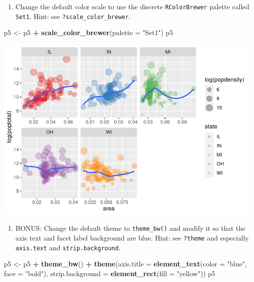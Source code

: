 \documentclass[
]{book}
\newenvironment{Shaded}{\begin{snugshade}}{\end{snugshade}}
\newcommand{\DataTypeTok}[1]{\textcolor[rgb]{0.13,0.29,0.53}{#1}}
\newcommand{\KeywordTok}[1]{\textcolor[rgb]{0.13,0.29,0.53}{\textbf{#1}}}
\newcommand{\NormalTok}[1]{#1}
\newcommand{\OperatorTok}[1]{\textcolor[rgb]{0.81,0.36,0.00}{\textbf{#1}}}
\newcommand{\StringTok}[1]{\textcolor[rgb]{0.31,0.60,0.02}{#1}}
\providecommand{\tightlist}{%
  \setlength{\itemsep}{0pt}\setlength{\parskip}{0pt}}
\begin{document}
\begin{alert}
\begin{enumerate}
\def\labelenumi{\arabic{enumi}.}
\setcounter{enumi}{4}
\tightlist
\item
  Change the default color scale to use the discrete \texttt{RColorBrewer} palette called \texttt{Set1}. Hint: see \texttt{?scale\_color\_brewer}.
\end{enumerate}

\begin{Shaded}
\begin{Highlighting}[]
\NormalTok{p5 \textless{}{-}}\StringTok{ }\NormalTok{p5 }\OperatorTok{+}\StringTok{ }\KeywordTok{scale\_color\_brewer}\NormalTok{(}\DataTypeTok{palette =} \StringTok{"Set1"}\NormalTok{)}
\NormalTok{p5}
\end{Highlighting}
\end{Shaded}

\includegraphics{R/Rgraphics/figures/unnamed-chunk-214-1.pdf}

\begin{enumerate}
\def\labelenumi{\arabic{enumi}.}
\setcounter{enumi}{5}
\tightlist
\item
  BONUS: Change the default theme to \texttt{theme\_bw()} and modify it so that the axis text and facet label background are blue. Hint: see \texttt{?theme} and especially \texttt{axis.text} and \texttt{strip.background}.
\end{enumerate}

\begin{Shaded}
\begin{Highlighting}[]
\NormalTok{p5 \textless{}{-}}\StringTok{ }\NormalTok{p5 }\OperatorTok{+}\StringTok{ }\KeywordTok{theme\_bw}\NormalTok{() }\OperatorTok{+}
\StringTok{    }\KeywordTok{theme}\NormalTok{(}\DataTypeTok{axis.title =} \KeywordTok{element\_text}\NormalTok{(}\DataTypeTok{color =} \StringTok{"blue"}\NormalTok{, }\DataTypeTok{face =} \StringTok{"bold"}\NormalTok{),}
          \DataTypeTok{strip.background =} \KeywordTok{element\_rect}\NormalTok{(}\DataTypeTok{fill =} \StringTok{"yellow"}\NormalTok{))}
\NormalTok{p5}
\end{Highlighting}
\end{Shaded}


\end{alert}
\end{document}
